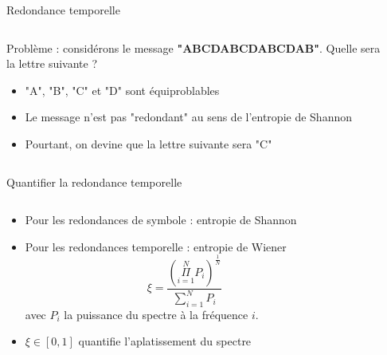 \documentclass[9pt, aspectratio=169]{beamer}
\begin{document}
\begin{frame}{Redondance temporelle} %

\begin{columns}
   \begin{column}{0.6\textwidth}

        Problème : considérons le message \textbf{"ABCDABCDABCDAB"}. Quelle sera la lettre suivante ?
        \begin{itemize}
            \item "A", "B", "C" et "D" sont équiproblables
            \item Le message n'est pas "redondant" au sens de l'entropie de Shannon
            \item Pourtant, on devine que la lettre suivante sera "C"
        
        \end{itemize}
        
   \end{column}
   \begin{column}{0.39\textwidth}
		
   \end{column}
\end{columns}
\end{frame}


\begin{frame}{Quantifier la redondance temporelle} %

\begin{columns}
   \begin{column}{0.6\textwidth}


        \begin{itemize}
            \item Pour les redondances de symbole : entropie de Shannon
            \item Pour les redondances temporelle : entropie de Wiener
            \begin{equation}
            	\xi = \frac{\left(\Pi\limits_{i=1}^N P_i \right)^\frac{1}{N}}{\sum\limits_{i=1}^N P_i}
            \end{equation}
            avec $P_i$ la puissance du spectre à la fréquence $i$.
            \item $\xi \in [0, 1]$ quantifie l'aplatissement du spectre
        
        \end{itemize}
        
   \end{column}
   \begin{column}{0.39\textwidth}
		
   \end{column}
\end{columns}
\end{frame}
\end{document}
